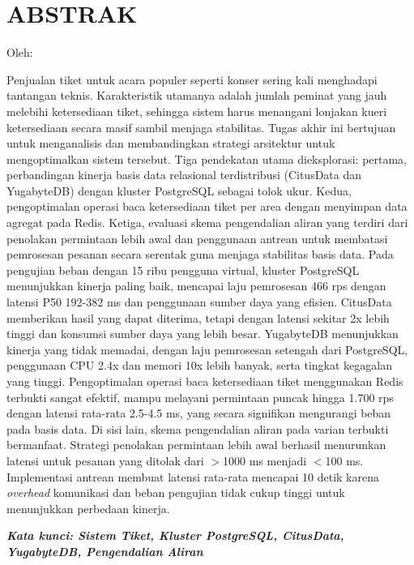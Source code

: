 \clearpage
\chapter*{ABSTRAK}
\begin{center}
  \center
  \begin{singlespace}
    \large\bfseries\MakeUppercase{\thetitle}

    \normalfont\normalsize
    Oleh:

    \bfseries \theauthor
  \end{singlespace}
\end{center}

\begin{singlespace}
  \small
  Penjualan tiket untuk acara populer seperti konser sering kali menghadapi tantangan teknis. Karakteristik utamanya adalah jumlah peminat yang jauh melebihi ketersediaan tiket, sehingga sistem harus menangani lonjakan kueri ketersediaan secara masif sambil menjaga stabilitas. Tugas akhir ini bertujuan untuk menganalisis dan membandingkan strategi arsitektur untuk mengoptimalkan sistem tersebut. Tiga pendekatan utama dieksplorasi: pertama, perbandingan kinerja basis data relasional terdistribusi (CitusData dan YugabyteDB) dengan kluster PostgreSQL sebagai tolok ukur. Kedua, pengoptimalan operasi baca ketersediaan tiket per area dengan menyimpan data agregat pada Redis. Ketiga, evaluasi skema pengendalian aliran yang terdiri dari penolakan permintaan lebih awal dan penggunaan antrean untuk membatasi pemrosesan pesanan secara serentak guna menjaga stabilitas basis data. Pada pengujian beban dengan 15 ribu pengguna virtual, kluster PostgreSQL menunjukkan kinerja paling baik, mencapai laju pemrosesan 466 rps dengan latensi P50 192-382 ms dan penggunaan sumber daya yang efisien. CitusData memberikan hasil yang dapat diterima, tetapi dengan latensi sekitar 2x lebih tinggi dan konsumsi sumber daya yang lebih besar. YugabyteDB menunjukkan kinerja yang tidak memadai, dengan laju pemrosesan setengah dari PostgreSQL, penggunaan CPU 2.4x dan memori 10x lebih banyak, serta tingkat kegagalan yang tinggi. Pengoptimalan operasi baca ketersediaan tiket menggunakan Redis terbukti sangat efektif, mampu melayani permintaan puncak hingga 1.700 rps dengan latensi rata-rata 2.5-4.5 ms, yang secara signifikan mengurangi beban pada basis data. Di sisi lain, skema pengendalian aliran pada varian terbukti bermanfaat. Strategi penolakan permintaan lebih awal berhasil menurunkan latensi untuk pesanan yang ditolak dari $>$1000 ms menjadi $<$100 ms. Implementasi antrean membuat latensi rata-rata mencapai 10 detik karena \textit{overhead} komunikasi dan beban pengujian tidak cukup tinggi untuk menunjukkan perbedaan kinerja.

  \textbf{\textit{Kata kunci: Sistem Tiket, Kluster PostgreSQL, CitusData, YugabyteDB, Pengendalian Aliran}}

\end{singlespace}
\clearpage